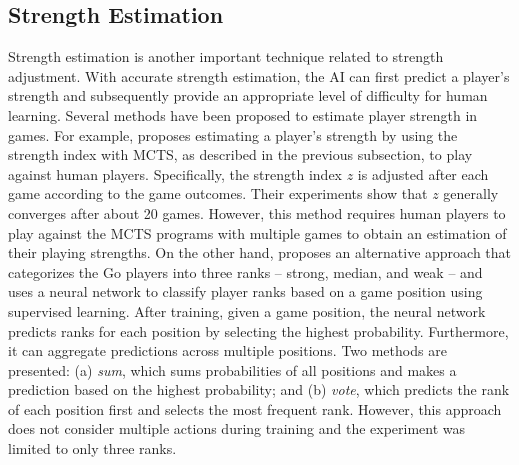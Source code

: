 \subsection{Strength Estimation}
\label{subsec:bg_se}
Strength estimation is another important technique related to strength adjustment.
With accurate strength estimation, the AI can first predict a player's strength and subsequently provide an appropriate level of difficulty for human learning.
Several methods \citep{moudrik_determining_2016, liu_strength_2020, egri-nagy_derived_2020, scheible_picking_2014} have been proposed to estimate player strength in games.
For example, \citet{liu_strength_2020} proposes estimating a player's strength by using the strength index with MCTS, as described in the previous subsection, to play against human players.
Specifically, the strength index $z$ is adjusted after each game according to the game outcomes.
Their experiments show that $z$ generally converges after about 20 games.
However, this method requires human players to play against the MCTS programs with multiple games to obtain an estimation of their playing strengths.
On the other hand, \citet{moudrik_determining_2016} proposes an alternative approach that categorizes the Go players into three ranks -- strong, median, and weak -- and uses a neural network to classify player ranks based on a game position using supervised learning.
After training, given a game position, the neural network predicts ranks for each position by selecting the highest probability.
Furthermore, it can aggregate predictions across multiple positions.
Two methods are presented: (a) \textit{sum}, which sums probabilities of all positions and makes a prediction based on the highest probability; and (b) \textit{vote}, which predicts the rank of each position first and selects the most frequent rank.
However, this approach does not consider multiple actions during training and the experiment was limited to only three ranks.


